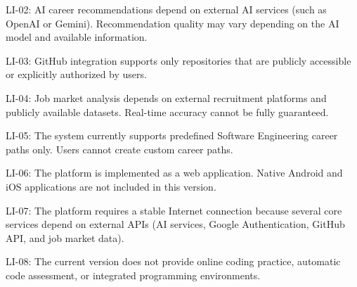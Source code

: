 LI-02: AI career recommendations depend on external AI services (such as OpenAI or Gemini). Recommendation quality may vary depending on the AI model and available information. 

LI-03: GitHub integration supports only repositories that are publicly accessible or explicitly authorized by users. 

LI-04: Job market analysis depends on external recruitment platforms and publicly available datasets. Real-time accuracy cannot be fully guaranteed. 

LI-05: The system currently supports predefined Software Engineering career paths only. Users cannot create custom career paths. 

LI-06: The platform is implemented as a web application. Native Android and iOS applications are not included in this version. 

LI-07: The platform requires a stable Internet connection because several core services depend on external APIs (AI services, Google Authentication, GitHub API, and job market data). 

LI-08: The current version does not provide online coding practice, automatic code assessment, or integrated programming environments.
